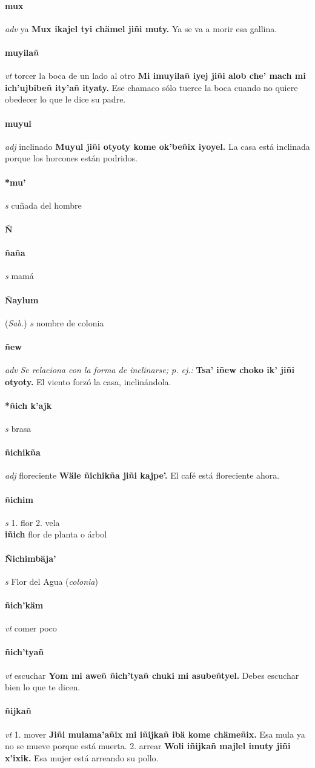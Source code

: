 \documentclass{scrbook}
\newcommand{\entry}[1]{\paragraph{#1}}
\newcommand{\alphaletter}[1]{\addsec{#1}}
\newcommand{\onedefinition}[1]{#1.}
\newcommand{\nontranslationdef}[1]{\textit{#1}}
\newcommand{\partofspeech}[1]{\textit{#1}}
\newcommand{\spanishtranslation}[1]{#1}
\newcommand{\clarification}[1]{(\textit{#1})}
\newcommand{\cholexample}[1]{\textbf{#1}}
\newcommand{\exampletranslation}[1]{#1}
\newcommand{\relevantdialect}[1]{(\textit{#1})}
\newcommand{\secondaryentry}[1]{\\\textbf{#1}}
\newcommand{\secondtranslation}[1]{#1}
\begin{document}
\begin{multicols}{2}
\entry{mux}
\partofspeech{adv}
\spanishtranslation{ya}
\cholexample{Mux ikajel tyi chämel jiñi muty.}
\exampletranslation{Ya se va a morir esa gallina.}

\entry{muyilañ}
\partofspeech{vt}
\spanishtranslation{torcer la boca de un lado al otro}
\cholexample{Mi imuyilañ iyej jiñi alob che' mach mi ich'ujbibeñ ity'añ ityaty.}
\exampletranslation{Ese chamaco sólo tuerce la boca cuando no quiere obedecer lo que le dice su padre.}

\entry{muyul}
\partofspeech{adj}
\spanishtranslation{inclinado}
\cholexample{Muyul jiñi otyoty kome ok'beñix iyoyel.}
\exampletranslation{La casa está inclinada porque los horcones están podridos.}

\entry{*mu'}
\partofspeech{s}
\spanishtranslation{cuñada del hombre}

\entry{Ñ}
\alphaletter{Ñ}

\entry{ñaña}
\partofspeech{s}
\spanishtranslation{mamá}

\entry{Ñaylum}
\relevantdialect{Sab.}
\partofspeech{s}
\spanishtranslation{nombre de colonia}

\entry{ñew}
\partofspeech{adv}
\nontranslationdef{Se relaciona con la forma de inclinarse; p. ej.:}
\cholexample{Tsa' iñew choko ik' jiñi otyoty.}
\exampletranslation{El viento forzó la casa, inclinándola.}

\entry{*ñich k'ajk}
\partofspeech{s}
\spanishtranslation{brasa}

\entry{ñichikña}
\partofspeech{adj}
\spanishtranslation{floreciente}
\cholexample{Wäle ñichikña jiñi kajpe'.}
\exampletranslation{El café está floreciente ahora.}

\entry{ñichim}
\partofspeech{s}
\onedefinition{1}
\spanishtranslation{flor}
\onedefinition{2}
\spanishtranslation{vela}
\secondaryentry{iñich}
\secondtranslation{flor de planta o árbol}

\entry{Ñichimbäja'}
\partofspeech{s}
\spanishtranslation{Flor del Agua}
\clarification{colonia}

\entry{ñich'käm}
\partofspeech{vt}
\spanishtranslation{comer poco}

\entry{ñich'tyañ}
\partofspeech{vt}
\spanishtranslation{escuchar}
\cholexample{Yom mi aweñ ñich'tyañ chuki mi asubeñtyel.}
\exampletranslation{Debes escuchar bien lo que te dicen.}

\entry{ñijkañ}
\partofspeech{vt}
\onedefinition{1}
\spanishtranslation{mover}
\cholexample{Jiñi mulama'añix mi iñijkañ ibä kome chämeñix.}
\exampletranslation{Esa mula ya no se mueve porque está muerta.}
\onedefinition{2}
\spanishtranslation{arrear}
\cholexample{Woli iñijkañ majlel imuty jiñi x'ixik.}
\exampletranslation{Esa mujer está arreando su pollo.}


\end{multicols}
\end{document}
